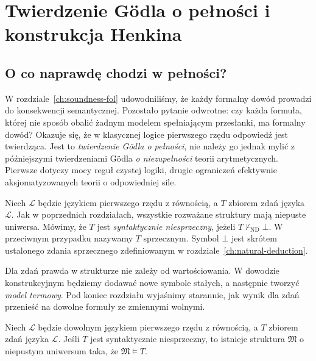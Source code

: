 \chapter{Twierdzenie Gödla o pełności i konstrukcja Henkina}
\label{ch:completeness}

\section{O co naprawdę chodzi w pełności?}
W rozdziale~\ref{ch:soundness-fol} udowodniliśmy, że każdy formalny dowód prowadzi do konsekwencji semantycznej. Pozostało pytanie odwrotne: czy każda formuła, której nie sposób obalić żadnym modelem spełniającym przesłanki, ma formalny dowód? Okazuje się, że w klasycznej logice pierwszego rzędu odpowiedź jest twierdząca. Jest to \emph{twierdzenie Gödla o pełności}, nie należy go jednak mylić z późniejszymi twierdzeniami Gödla \emph{o niezupełności} teorii arytmetycznych. Pierwsze dotyczy mocy reguł czystej logiki, drugie ograniczeń efektywnie aksjomatyzowanych teorii o odpowiedniej sile.

\begin{definicja}\label{def:henkin-consistency}
Niech $\mathcal L$ będzie językiem pierwszego rzędu z równością, a $T$ zbiorem zdań języka $\mathcal L$. Jak w poprzednich rozdziałach, wszystkie rozważane struktury mają niepuste uniwersa. Mówimy, że $T$ jest \emph{syntaktycznie niesprzeczny}, jeżeli $T\nvdash_{\mathrm{ND}}\bot$. W przeciwnym przypadku nazywamy $T$ sprzecznym. Symbol $\bot$ jest skrótem ustalonego zdania sprzecznego zdefiniowanym w rozdziale~\ref{ch:natural-deduction}.
\end{definicja}

\begin{uwaga}
Dla zdań prawda w strukturze nie zależy od wartościowania. W dowodzie konstrukcyjnym będziemy dodawać nowe symbole stałych, a następnie tworzyć \emph{model termowy}. Pod koniec rozdziału wyjaśnimy starannie, jak wynik dla zdań przenieść na dowolne formuły ze zmiennymi wolnymi.
\end{uwaga}

\begin{twierdzenie}\label{thm:henkin-model-existence}
Niech $\mathcal L$ będzie dowolnym językiem pierwszego rzędu z równością, a $T$ zbiorem zdań języka $\mathcal L$. Jeśli $T$ jest syntaktycznie niesprzeczny, to istnieje struktura $\mathfrak M$ o niepustym uniwersum taka, że $\mathfrak M\models T$.
\end{twierdzenie}

